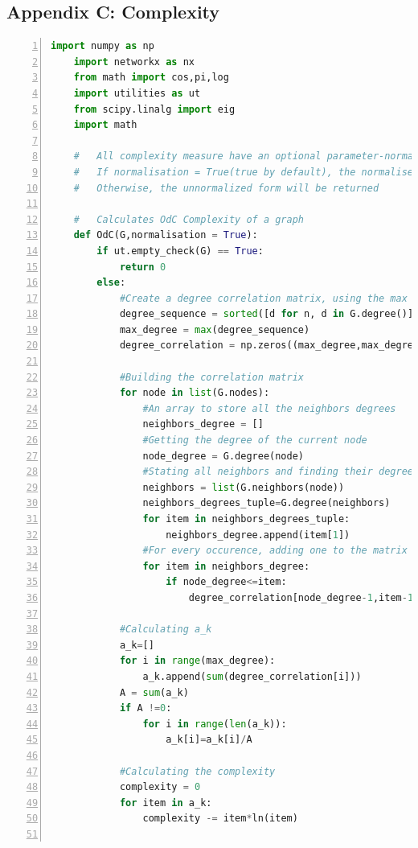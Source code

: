 \documentclass[12pt]{article}
\begin{document}
\subsection{Appendix C: Complexity}
\begin{lstlisting}[numbers=left,language=Python,breaklines=true]
    import numpy as np
    import networkx as nx
    from math import cos,pi,log
    import utilities as ut
    from scipy.linalg import eig
    import math
    
    #   All complexity measure have an optional parameter-normalisation
    #   If normalisation = True(true by default), the normalised value will be returned
    #   Otherwise, the unnormalized form will be returned
    
    #   Calculates OdC Complexity of a graph
    def OdC(G,normalisation = True):
        if ut.empty_check(G) == True:
            return 0
        else:
            #Create a degree correlation matrix, using the max degree 
            degree_sequence = sorted([d for n, d in G.degree()], reverse=True)
            max_degree = max(degree_sequence)
            degree_correlation = np.zeros((max_degree,max_degree))
            
            #Building the correlation matrix
            for node in list(G.nodes):
                #An array to store all the neighbors degrees
                neighbors_degree = []
                #Getting the degree of the current node
                node_degree = G.degree(node)
                #Stating all neighbors and finding their degrees
                neighbors = list(G.neighbors(node))
                neighbors_degrees_tuple=G.degree(neighbors)
                for item in neighbors_degrees_tuple:
                    neighbors_degree.append(item[1])
                #For every occurence, adding one to the matrix
                for item in neighbors_degree:
                    if node_degree<=item:
                        degree_correlation[node_degree-1,item-1] +=1
                        
            #Calculating a_k
            a_k=[]
            for i in range(max_degree):
                a_k.append(sum(degree_correlation[i]))
            A = sum(a_k)
            if A !=0:
                for i in range(len(a_k)):
                    a_k[i]=a_k[i]/A
            
            #Calculating the complexity
            complexity = 0
            for item in a_k:
                complexity -= item*ln(item)
            

\end{lstlisting}
\end{document}
